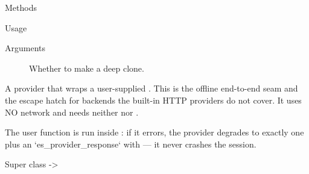 \documentclass[a4paper]{book}
\begin{document}
\begin{Section}{Methods}
\begin{SubSection}{}
\begin{SubSubSection}{Usage}
\end{SubSubSection}

%
\begin{SubSubSection}{Arguments}

\begin{description}

\item[] Whether to make a deep clone.

\end{description}



\end{SubSubSection}

\end{SubSection}


\end{Section}
%
\begin{Description}
A provider that wraps a user-supplied
. This is the
offline end-to-end seam and the escape hatch for backends the built-in HTTP
providers do not cover. It uses NO network and needs neither 
nor .

The user function is run inside : if it errors, the provider
degrades to exactly one  plus an `es\_provider\_response` with
 — it never crashes the session.
\end{Description}
%
\begin{Section}{Super class}
 -> 
\end{Section}
%
\end{document}
